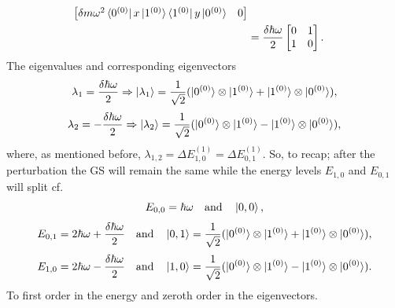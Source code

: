 \begin{example}
\begin{enumerate}
\begin{equation}
\begin{split}
\begin{bmatrix}
					\delta m\omega^2\bra{0^{(0)}}x\ket{1^{(0)}}\bra{1^{(0)}}y\ket{0^{(0)}} & 0\\
				\end{bmatrix}\\
				&=\frac{\delta\hbar\omega}{2}\begin{bmatrix}
					0 & 1\\
					1 & 0\\
				\end{bmatrix}.\\
			\end{split}
		\end{equation} 
		The eigenvalues and corresponding eigenvectors
		\begin{equation}
			\lambda_{1}=\frac{\delta\hbar\omega}{2}\Rightarrow \ket{\lambda_1}=\frac{1}{\sqrt{2}}(\ket{0^{(0)}}\otimes\ket{1^{(0)}} + \ket{1^{(0)}}\otimes\ket{0^{(0)}}),
		\end{equation} 
		\begin{equation}
			\lambda_{2}=-\frac{\delta\hbar\omega}{2}\Rightarrow \ket{\lambda_2}=\frac{1}{\sqrt{2}}(\ket{0^{(0)}}\otimes\ket{1^{(0)}} - \ket{1^{(0)}}\otimes\ket{0^{(0)}}),
		\end{equation} 
		where, as mentioned before, $\lambda_{1,2}=\Delta E_{1,0}^{(1)}=\Delta E_{0,1}^{(1)}$. So, to recap; after the perturbation the GS will remain the same while the energy levels $E_{1,0}$ and $E_{0,1}$ will split cf.
		\begin{equation}
			E_{0,0}=\hbar\omega \quad \mbox{and} \quad \ket{0,0},
		\end{equation} 
		\begin{equation}
			E_{0,1}=2\hbar\omega+\frac{\delta\hbar\omega}{2} \quad \mbox{and} \quad \ket{0,1}=\frac{1}{\sqrt{2}}(\ket{0^{(0)}}\otimes\ket{1^{(0)}} + \ket{1^{(0)}}\otimes\ket{0^{(0)}}),
		\end{equation}
		\begin{equation}
			E_{1,0}=2\hbar\omega-\frac{\delta\hbar\omega}{2} \quad \mbox{and} \quad \ket{1,0}=\frac{1}{\sqrt{2}}(\ket{0^{(0)}}\otimes\ket{1^{(0)}} - \ket{1^{(0)}}\otimes\ket{0^{(0)}}).
		\end{equation} 
		To first order in the energy and zeroth order in the eigenvectors.
		
	\end{enumerate}
\end{example}

